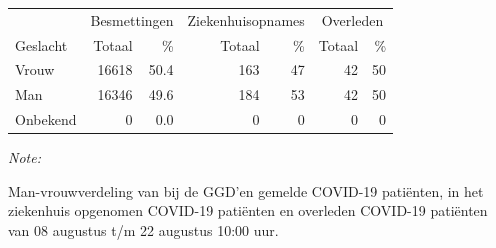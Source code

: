 \documentclass[
  english,
  man,floatsintext]{apa6}
\begin{document}
\begin{table}
\centering\begingroup\fontsize{11}{13}\selectfont

\begin{threeparttable}
\begin{tabular}{lrrrrrr}
\toprule
\multicolumn{1}{c}{ } & \multicolumn{2}{c}{Besmettingen} & \multicolumn{2}{c}{Ziekenhuisopnames} & \multicolumn{2}{c}{Overleden} \\
\cmidrule(l{3pt}r{3pt}){2-3} \cmidrule(l{3pt}r{3pt}){4-5} \cmidrule(l{3pt}r{3pt}){6-7}
Geslacht & Totaal & \% & Totaal & \% & Totaal & \%\\
\midrule
Vrouw & 16618 & 50.4 & 163 & 47 & 42 & 50\\
Man & 16346 & 49.6 & 184 & 53 & 42 & 50\\
Onbekend & 0 & 0.0 & 0 & 0 & 0 & 0\\
\bottomrule
\end{tabular}
\begin{tablenotes}
\item \textit{Note: } 
\item Man-vrouwverdeling van bij de GGD’en gemelde COVID-19 patiënten, in het ziekenhuis opgenomen COVID-19 patiënten en overleden COVID-19 patiënten van 08 augustus t/m 22 augustus 10:00 uur.
\end{tablenotes}
\end{threeparttable}
\endgroup{}
\end{table}
\newpage
\end{document}
